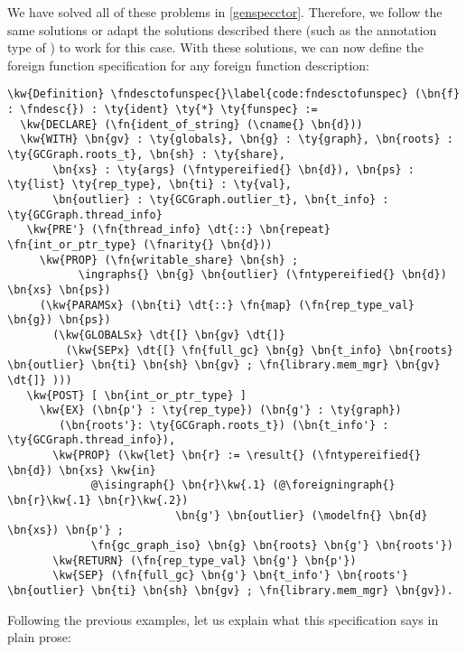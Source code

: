We have solved all of these problems in \autoref{genspecctor}. Therefore, we follow the same solutions or adapt the solutions described there (such as the annotation type of \ingraphs{}) to work for this case. With these solutions, we can now define the \gls{foreign function} specification for any \gls{foreign function} description: 


\newcommand{\fndesctofunspec}{\hyperref[code:fndesctofunspec]{\fn{fn\_\linebreak[0]desc\_\linebreak[0]to\_\linebreak[0]funspec}}}
\begin{Verbatim}
\kw{Definition} \fndesctofunspec{}\label{code:fndesctofunspec} (\bn{f} : \fndesc{}) : \ty{ident} \ty{*} \ty{funspec} :=
  \kw{DECLARE} (\fn{ident_of_string} (\cname{} \bn{d}))
  \kw{WITH} \bn{gv} : \ty{globals}, \bn{g} : \ty{graph}, \bn{roots} : \ty{GCGraph.roots_t}, \bn{sh} : \ty{share},
       \bn{xs} : \ty{args} (\fntypereified{} \bn{d}), \bn{ps} : \ty{list} \ty{rep_type}, \bn{ti} : \ty{val},
       \bn{outlier} : \ty{GCGraph.outlier_t}, \bn{t_info} : \ty{GCGraph.thread_info}
   \kw{PRE'} (\fn{thread_info} \dt{::} \bn{repeat} \fn{int_or_ptr_type} (\fnarity{} \bn{d}))
     \kw{PROP} (\fn{writable_share} \bn{sh} ;
           \ingraphs{} \bn{g} \bn{outlier} (\fntypereified{} \bn{d}) \bn{xs} \bn{ps})
     (\kw{PARAMSx} (\bn{ti} \dt{::} \fn{map} (\fn{rep_type_val} \bn{g}) \bn{ps})
       (\kw{GLOBALSx} \dt{[} \bn{gv} \dt{]}
         (\kw{SEPx} \dt{[} \fn{full_gc} \bn{g} \bn{t_info} \bn{roots} \bn{outlier} \bn{ti} \bn{sh} \bn{gv} ; \fn{library.mem_mgr} \bn{gv} \dt{]} )))
   \kw{POST} [ \bn{int_or_ptr_type} ]
     \kw{EX} (\bn{p'} : \ty{rep_type}) (\bn{g'} : \ty{graph})
        (\bn{roots'}: \ty{GCGraph.roots_t}) (\bn{t_info'} : \ty{GCGraph.thread_info}),
       \kw{PROP} (\kw{let} \bn{r} := \result{} (\fntypereified{} \bn{d}) \bn{xs} \kw{in}
             @\isingraph{} \bn{r}\kw{.1} (@\foreigningraph{} \bn{r}\kw{.1} \bn{r}\kw{.2})
                          \bn{g'} \bn{outlier} (\modelfn{} \bn{d} \bn{xs}) \bn{p'} ;
             \fn{gc_graph_iso} \bn{g} \bn{roots} \bn{g'} \bn{roots'})
       \kw{RETURN} (\fn{rep_type_val} \bn{g'} \bn{p'})
       \kw{SEP} (\fn{full_gc} \bn{g'} \bn{t_info'} \bn{roots'} \bn{outlier} \bn{ti} \bn{sh} \bn{gv} ; \fn{library.mem_mgr} \bn{gv}).
\end{Verbatim}

\newpage
Following the previous examples, let us explain what this specification says in plain prose: 


